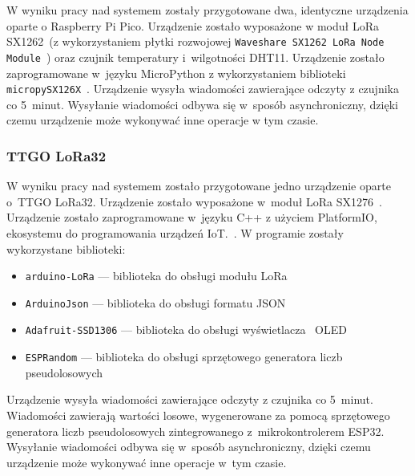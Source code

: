 W wyniku pracy nad systemem zostały przygotowane dwa, identyczne urządzenia oparte o Raspberry Pi Pico.
Urządzenie zostało wyposażone w moduł LoRa SX1262~\cite{PICO:sx1262-doc}(z wykorzystaniem płytki rozwojowej \texttt{Waveshare SX1262 LoRa Node Module}~\cite{PICO:waveshare-doc}) oraz czujnik temperatury i~wilgotności DHT11.
Urządzenie zostało zaprogramowane w~języku MicroPython z wykorzystaniem biblioteki \texttt{micropySX126X}~\cite{PICO:lora-lib}.
Urządzenie wysyła wiadomości zawierające odczyty z czujnika co 5~minut.
Wysyłanie wiadomości odbywa się w~sposób asynchroniczny, dzięki czemu urządzenie może wykonywać inne operacje w tym czasie.

\subsubsection{TTGO LoRa32}
W wyniku pracy nad systemem zostało przygotowane jedno urządzenie oparte o~TTGO LoRa32.
Urządzenie zostało wyposażone w~moduł LoRa SX1276~\cite{ESP32:sx1276-doc}.
Urządzenie zostało zaprogramowane w~języku C++ z użyciem PlatformIO, ekosystemu do programowania urządzeń IoT.~\cite{tool:pio}.
W programie zostały wykorzystane biblioteki:
\begin{itemize}
    \item \texttt{arduino-LoRa} — biblioteka do obsługi modułu LoRa~\cite{ESP32:lora-lib}
    \item \texttt{ArduinoJson} — biblioteka do obsługi formatu JSON~\cite{ESP32:ArduinoJson}
    \item \texttt{Adafruit-SSD1306} — biblioteka do obsługi wyświetlacza~\cite{ESP32:Adafruit-SSD1306} OLED
    \item \texttt{ESPRandom} — biblioteka do obsługi sprzętowego generatora liczb pseudolosowych~\cite{ESP32:ESPRandom}
\end{itemize}
Urządzenie wysyła wiadomości zawierające odczyty z czujnika co 5~minut.
Wiadomości zawierają wartości losowe, wygenerowane za pomocą sprzętowego generatora liczb pseudolosowych zintegrowanego z~mikrokontrolerem ESP32.
Wysyłanie wiadomości odbywa się w~sposób asynchroniczny, dzięki czemu urządzenie może wykonywać inne operacje w~tym czasie.


